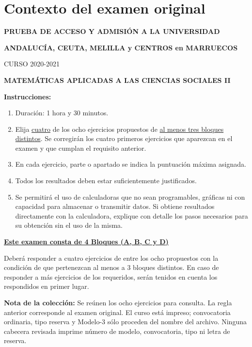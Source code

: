 \section*{Contexto del examen original}
\textbf{PRUEBA DE ACCESO Y ADMISIÓN A LA UNIVERSIDAD}\par
\textbf{ANDALUCÍA, CEUTA, MELILLA y CENTROS en MARRUECOS}\par
CURSO 2020-2021\par
\textbf{MATEMÁTICAS APLICADAS A LAS CIENCIAS SOCIALES II}

\textbf{Instrucciones:}
\begin{enumerate}[label=\textbf{\alph*)}]
  \item Duración: 1 hora y 30 minutos.
  \item Elija \underline{cuatro} de los ocho ejercicios propuestos de
  \underline{al menos tres bloques distintos}. Se corregirán los cuatro
  primeros ejercicios que aparezcan en el examen y que cumplan el requisito
  anterior.
  \item En cada ejercicio, parte o apartado se indica la puntuación máxima
  asignada.
  \item Todos los resultados deben estar suficientemente justificados.
  \item Se permitirá el uso de calculadoras que no sean programables,
  gráficas ni con capacidad para almacenar o transmitir datos. Si obtiene
  resultados directamente con la calculadora, explique con detalle los pasos
  necesarios para su obtención sin el uso de la misma.
\end{enumerate}
\textbf{\underline{Este examen consta de 4 Bloques (A, B, C y D)}}\par
Deberá responder a cuatro ejercicios de entre los ocho propuestos con la
condición de que pertenezcan al menos a 3 bloques distintos. En caso de
responder a más ejercicios de los requeridos, serán tenidos en cuenta los
respondidos en primer lugar.

\noindent\textbf{Nota de la colección:} Se reúnen los ocho ejercicios para
consulta. La regla anterior corresponde al examen original. El curso está
impreso; convocatoria ordinaria, tipo reserva y Modelo-3 sólo proceden del
nombre del archivo. Ninguna cabecera revisada imprime número de modelo,
convocatoria, tipo ni letra de reserva.
\par\medskip
